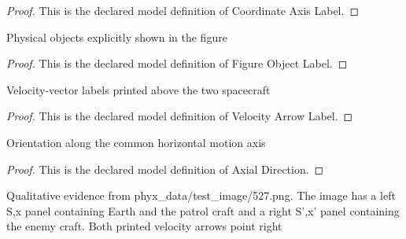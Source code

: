 \begin{proof}
  This is the declared model definition of Coordinate Axis Label.
\end{proof}
\begin{definition}
  \label{def:physics:phyx-mini-0527:phyxminiproblems-problemphyxmini0527-figureobjectlabel}
  Physical objects explicitly shown in the figure
\end{definition}
\begin{proof}
  This is the declared model definition of Figure Object Label.
\end{proof}
\begin{definition}
  \label{def:physics:phyx-mini-0527:phyxminiproblems-problemphyxmini0527-velocityarrowlabel}
  Velocity-vector labels printed above the two spacecraft
\end{definition}
\begin{proof}
  This is the declared model definition of Velocity Arrow Label.
\end{proof}
\begin{definition}
  \label{def:physics:phyx-mini-0527:phyxminiproblems-problemphyxmini0527-axialdirection}
  Orientation along the common horizontal motion axis
\end{definition}
\begin{proof}
  This is the declared model definition of Axial Direction.
\end{proof}
\begin{definition}
  \label{def:physics:phyx-mini-0527:phyxminiproblems-problemphyxmini0527-spacecraftpursuitfigure}
  Qualitative evidence from phyx\_data/test\_image/527.png. The image has a left S,x panel containing Earth and the patrol craft and a right S',x' panel containing the enemy craft. Both printed velocity arrows point right
\end{definition}
